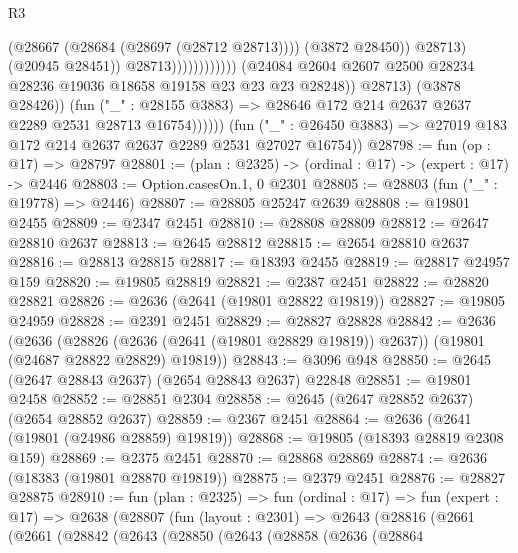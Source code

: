 \begin{lexlean}{R3}
\begin{coremodule}
                                                    (@28667 (@28684 (@28697 (@28712 @28713))))
                                                    (@3872 @28450))
                                                  @28713)
                                                (@20945 @28451))
                                              @28713))))))))))))
                      (@24084
                        @2604
                        @2607
                        @2500
                        @28234
                        @28236
                        @19036
                        @18658
                        @19158
                        @23
                        @23
                        @23
                        @28248))
                    @28713)
                  (@3878 @28426))
                (fun ("_" : @28155 @3883) =>
                @28646 @172 @214 @2637 @2637 @2289 @2531 @28713 @16754))))))
      (fun ("_" : @26450 @3883) => @27019 @183 @172 @214 @2637 @2637 @2289 @2531 @27027 @16754))
@28798 := fun (op : @17) => @28797
@28801 := (plan : @2325) -> (ordinal : @17) -> (expert : @17) -> @2446
@28803 := Option.casesOn.{1, 0} @2301
@28805 := @28803 (fun ("_" : @19778) => @2446)
@28807 := @28805 @25247 @2639
@28808 := @19801 @2455
@28809 := @2347 @2451
@28810 := @28808 @28809
@28812 := @2647 @28810 @2637
@28813 := @2645 @28812
@28815 := @2654 @28810 @2637
@28816 := @28813 @28815
@28817 := @18393 @2455
@28819 := @28817 @24957 @159
@28820 := @19805 @28819
@28821 := @2387 @2451
@28822 := @28820 @28821
@28826 := @2636 (@2641 (@19801 @28822 @19819))
@28827 := @19805 @24959
@28828 := @2391 @2451
@28829 := @28827 @28828
@28842 := @2636
    (@2636
      (@28826 (@2636 (@2641 (@19801 @28829 @19819)) @2637))
      (@19801 (@24687 @28822 @28829) @19819))
@28843 := @3096 @948
@28850 := @2645 (@2647 @28843 @2637) (@2654 @28843 @2637) @22848
@28851 := @19801 @2458
@28852 := @28851 @2304
@28858 := @2645 (@2647 @28852 @2637) (@2654 @28852 @2637)
@28859 := @2367 @2451
@28864 := @2636 (@2641 (@19801 (@24986 @28859) @19819))
@28868 := @19805 (@18393 @28819 @2308 @159)
@28869 := @2375 @2451
@28870 := @28868 @28869
@28874 := @2636 (@18383 (@19801 @28870 @19819))
@28875 := @2379 @2451
@28876 := @28827 @28875
@28910 := fun (plan : @2325) =>
  fun (ordinal : @17) =>
  fun (expert : @17) =>
  @2638
    (@28807
      (fun (layout : @2301) =>
      @2643
        (@28816
          (@2661
            (@2661
              (@28842
                (@2643
                  (@28850
                    (@2643
                      (@28858
                        (@2636
                          (@28864

\end{coremodule}
\end{lexlean}
